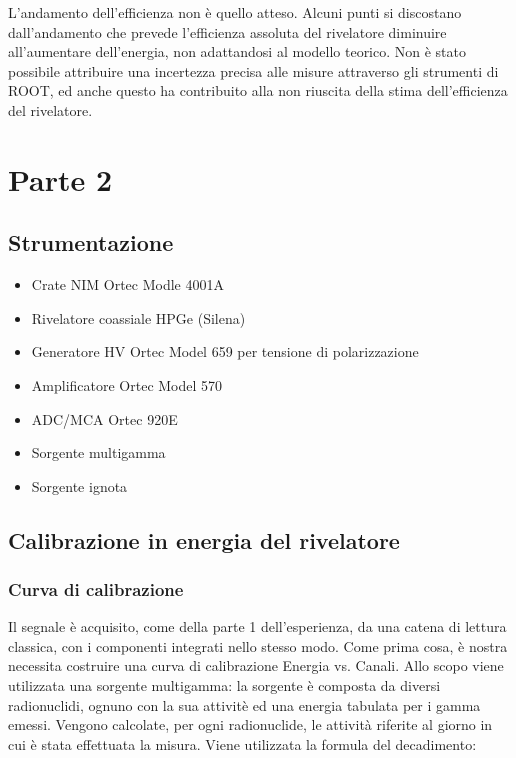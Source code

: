 \documentclass[a4paper,10pt]{article}
\begin{document}
L'andamento dell'efficienza non \`e quello atteso. Alcuni punti si discostano dall'andamento che prevede l'efficienza assoluta del rivelatore diminuire all'aumentare dell'energia, non adattandosi al modello teorico. Non \`e stato possibile attribuire una incertezza precisa alle misure attraverso gli strumenti di ROOT, ed anche questo ha contribuito alla non riuscita della stima dell'efficienza del rivelatore.

\section{Parte 2}


\subsection{Strumentazione}
\begin{itemize}
\item Crate NIM Ortec Modle 4001A
\item Rivelatore coassiale HPGe (Silena)
\item Generatore HV Ortec Model 659 per tensione di polarizzazione
\item Amplificatore Ortec Model 570
\item ADC/MCA Ortec 920E
\item Sorgente multigamma
\item Sorgente ignota
\end{itemize}
\subsection{Calibrazione in energia del rivelatore}

 
\subsubsection{Curva di calibrazione}
Il segnale \`e acquisito, come della parte 1 dell'esperienza, da una catena di lettura classica, con i componenti integrati nello stesso modo. Come prima cosa, \`e nostra necessita costruire una curva di calibrazione Energia vs. Canali. Allo scopo viene utilizzata una sorgente multigamma: la sorgente \`e composta da diversi radionuclidi, ognuno con la sua attivit\`e ed una energia tabulata per i gamma emessi. Vengono calcolate, per ogni radionuclide, le attività riferite al giorno in cui \`e stata effettuata la misura. Viene utilizzata la formula del decadimento:
\end{document}
